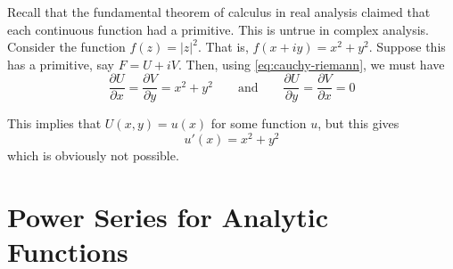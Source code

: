 Recall that the fundamental theorem of calculus in real analysis claimed that each continuous function had a primitive. This is untrue in complex analysis. Consider the function $f(z) = |z|^2$. That is, $f(x + iy) = x^2 + y^2$. Suppose this has a primitive, say $F = U + iV$. Then, using \ref{eq:cauchy-riemann}, we must have 
\begin{equation*}
    \frac{\partial U}{\partial x} = \frac{\partial V}{\partial y} = x^2 + y^2\qquad\text{and}\qquad\frac{\partial U}{\partial y} = \frac{\partial V}{\partial x} = 0
\end{equation*}

This implies that $U(x,y) = u(x)$ for some function $u$, but this gives 
\begin{equation*}
    u'(x) = x^2 + y^2
\end{equation*}
which is obviously not possible.

\section{Power Series for Analytic Functions}

